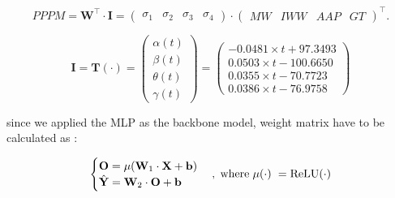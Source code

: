 \documentclass[12pt]{article}
\begin{document}
\begin{equation}
		PPPM = \textbf{W}^{\top}\cdot\textbf{I}=
		\begin{pmatrix}
			\sigma_1 & \sigma_2 & \sigma_3 & \sigma_4
		\end{pmatrix}\cdot\begin{pmatrix}
		MW & IWW & AAP & GT
		\end{pmatrix}^{\top}. 
	\label{map}
\end{equation}

\begin{equation}
	\textbf{I} =  \textbf{T}(\cdot)=\begin{pmatrix}
	\alpha(t) \\ \beta(t) \\ \theta(t) \\ \gamma(t)
\end{pmatrix}=
\begin{pmatrix}
	-0.0481\times t+97.3493 \\ 0.0503\times t -100.6650 \\ 0.0355\times t-70.7723 \\ 0.0386\times t-76.9758
\end{pmatrix}
\end{equation}

since we applied the MLP as the backbone model, weight matrix have to be calculated as :

\begin{equation}
	\begin{cases}
		\textbf{O} =\mu(\textbf{W}_1\cdot\textbf{X}+\textbf{b})  \\
		\hat{\textbf{Y}} = \textbf{W}_2\cdot\textbf{O} +\textbf{b}
	\end{cases},\hspace{0.3em}\text{where}\hspace{0.3em}\mu(\cdot)\hspace{0.3em}=\mathrm{ReLU(\cdot)}
\end{equation}
\end{document}
